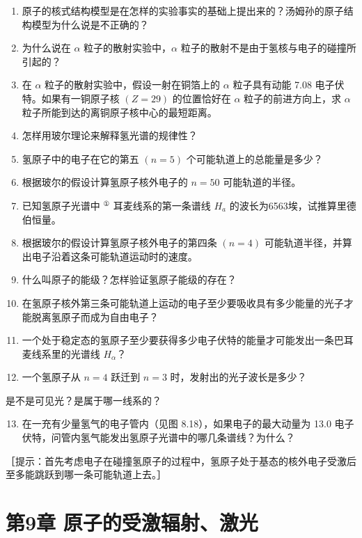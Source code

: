 \begin{enumerate}
\item
  原子的核式结构模型是在怎样的实验事实的基础上提出来的？汤姆孙的原子结构模型为什么说是不正确的？
\item
  为什么说在 \(\alpha\) 粒子的散射实验中，\(\alpha\)
  粒子的散射不是由于氢核与电子的碰撞所引起的？
\item
  在 \(\alpha\) 粒子的散射实验中，假设一射在铜箔上的 \(\alpha\)
  粒子具有动能 7.08 电子伏特。如果有一铜原子核 \((Z = 29)\) 的位置恰好在
  \(\alpha\) 粒子的前进方向上，求 \(\alpha\)
  粒子所能到达的离铜原子核中心的最短距离。
\item
  怎样用玻尔理论来解释氢光谱的规律性？
\item
  氢原子中的电子在它的第五 \((n = 5)\) 个可能轨道上的总能量是多少？
\item
  根据玻尔的假设计算氢原子核外电子的 \(n = 50\) 可能轨道的半径。
\item
  已知氢原子光谱中 \(^{①}\) 耳麦线系的第一条谱线 \(H_{a}\)
  的波长为6563埃，试推算里德伯恒量。
\item
  根据玻尔的假设计算氢原子核外电子的第四条 \((n = 4)\)
  可能轨道半径，并算出电子沿着这条可能轨道运动时的速度。
\item
  什么叫原子的能级？怎样验证氢原子能级的存在？
\item
  在氢原子核外第三条可能轨道上运动的电子至少要吸收具有多少能量的光子才能脱离氢原子而成为自由电子？
\item
  一个处于稳定态的氢原子至少要获得多少电子伏特的能量才可能发出一条巴耳麦线系里的光谱线
  \(H_{\alpha}\)？
\item
  一个氢原子从 \(n = 4\) 跃迁到 \(n = 3\) 时，发射出的光子波长是多少？
\end{enumerate}

是不是可见光？是属于哪一线系的？

\begin{enumerate}
\setcounter{enumi}{12}
\item
  在一充有少量氢气的电子管内（见图 8.18），如果电子的最大动量为 13.0
  电子伏特，问管内氢气能发出氢原子光谱中的哪几条谱线？为什么？
\end{enumerate}

［提示：首先考虑电子在碰撞氢原子的过程中，氢原子处于基态的核外电子受激后至多能跳跃到哪一条可能轨道上去。］

\chapter{第9章
原子的受激辐射、激光}

